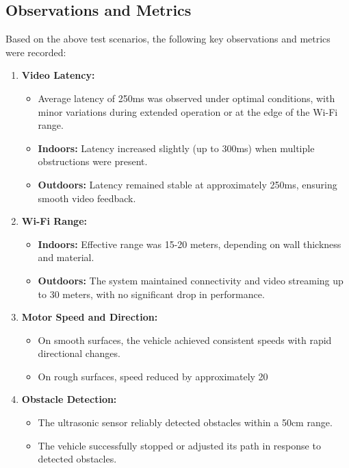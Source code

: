 \documentclass[12pt,a4paper]{report}
\begin{document}
\label{Observations and Metrics}
\subsection{Observations and Metrics}

Based on the above test scenarios, the following key observations and metrics were recorded:

\begin{enumerate}
    \item \textbf{Video Latency:}
    \begin{itemize}
        \item Average latency of 250ms was observed under optimal conditions, with minor variations during extended operation or at the edge of the Wi-Fi range.
        \item \textbf{Indoors:} Latency increased slightly (up to 300ms) when multiple obstructions were present.
        \item \textbf{Outdoors:} Latency remained stable at approximately 250ms, ensuring smooth video feedback.
    \end{itemize}
    
    \item \textbf{Wi-Fi Range:}
    \begin{itemize}
        \item \textbf{Indoors:} Effective range was 15-20 meters, depending on wall thickness and material.
        \item \textbf{Outdoors:} The system maintained connectivity and video streaming up to 30 meters, with no significant drop in performance.
    \end{itemize}
    
    \item \textbf{Motor Speed and Direction:}
    \begin{itemize}
        \item On smooth surfaces, the vehicle achieved consistent speeds with rapid directional changes.
        \item On rough surfaces, speed reduced by approximately 20%
    \end{itemize}
    
    \item \textbf{Obstacle Detection:}
    \begin{itemize}
        \item The ultrasonic sensor reliably detected obstacles within a 50cm range.
        \item The vehicle successfully stopped or adjusted its path in response to detected obstacles.
    \end{itemize}
    

\end{enumerate}
\end{document}
